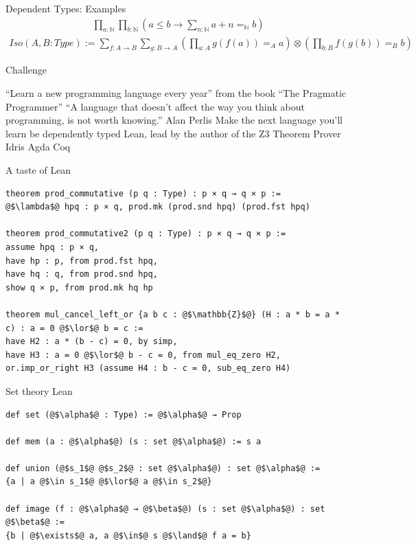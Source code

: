 \documentclass[pdf]{beamer}
\begin{document}
\begin{frame}{Dependent Types: Examples}
  \pause
  \begin{align*}
    \prod_{a : \mathbb{N}} \prod_{b: \mathbb{N}} (a \leq b \to \sum_{n:\mathbb{N}} a + n =_{\mathbb{N}} b)
  \end{align*}
  \pause
  \begin{align*}
    Iso(A, B : Type) := \sum_{f : A \to B}\sum_{g : B \to A} (\prod_{a : A}{g(f(a)) =_{A} a}) \otimes (\prod_{b : B}{f(g(b)) =_{B} b})
  \end{align*}
  \begin{outline}
  \end{outline}
\end{frame}

\begin{frame}{Challenge}
  \begin{outline}
    \1 ``Learn a new programming language every year'' from the book ``The Pragmatic Programmer''
    \pause
    \1 ``A language that doesn't affect the way you think about programming, is not worth knowing.'' Alan Perlis
    \pause
    \1 Make the next language you'll learn be dependently typed
    \pause
    \2 Lean, lead by the author of the Z3 Theorem Prover
    \pause
    \2 Idris
    \pause
    \2 Agda
    \pause
    \2 Coq
  \end{outline}
\end{frame}

\begin{frame}[fragile]{A taste of Lean}
  \begin{verbatim}
theorem prod_commutative (p q : Type) : p × q → q × p :=
@$\lambda$@ hpq : p × q, prod.mk (prod.snd hpq) (prod.fst hpq)

theorem prod_commutative2 (p q : Type) : p × q → q × p :=
assume hpq : p × q,
have hp : p, from prod.fst hpq,
have hq : q, from prod.snd hpq,
show q × p, from prod.mk hq hp

theorem mul_cancel_left_or {a b c : @$\mathbb{Z}$@} (H : a * b = a * c) : a = 0 @$\lor$@ b = c :=
have H2 : a * (b - c) = 0, by simp,
have H3 : a = 0 @$\lor$@ b - c = 0, from mul_eq_zero H2,
or.imp_or_right H3 (assume H4 : b - c = 0, sub_eq_zero H4)
  \end{verbatim}
\end{frame}

\begin{frame}[fragile]{Set theory Lean}
  \begin{verbatim}
def set (@$\alpha$@ : Type) := @$\alpha$@ → Prop

def mem (a : @$\alpha$@) (s : set @$\alpha$@) := s a

def union (@$s_1$@ @$s_2$@ : set @$\alpha$@) : set @$\alpha$@ :=
{a | a @$\in s_1$@ @$\lor$@ a @$\in s_2$@}

def image (f : @$\alpha$@ → @$\beta$@) (s : set @$\alpha$@) : set @$\beta$@ :=
{b | @$\exists$@ a, a @$\in$@ s @$\land$@ f a = b}
  \end{verbatim}
\end{frame}
\end{document}
